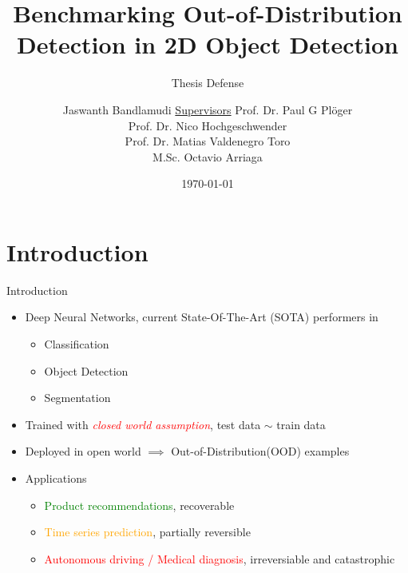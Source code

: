 \documentclass[10pt, aspectratio=169]{beamer}
\author[Jaswanth]{Jaswanth Bandlamudi \newline \newline \underline{Supervisors} \newline \vfill Prof. Dr. Paul G Pl\"{o}ger\\Prof. Dr. Nico Hochgeschwender \\ Prof. Dr. Matias Valdenegro Toro \\ M.Sc. Octavio Arriaga}
\title{Benchmarking Out-of-Distribution Detection in 2D Object Detection}
\subtitle{Thesis Defense}
\institute[HBRS]{Hochschule Bonn-Rhein-Sieg}
\date{\today}
\begin{document}
\setlength{\parskip}{1em}
\renewcommand{\baselinestretch}{1.25}
{
\begin{frame}
\titlepage
\end{frame}
}

\section{Introduction}
\begin{frame}{Introduction}
\begin{itemize}
    \item Deep Neural Networks, current State-Of-The-Art (SOTA) performers in 
    \begin{itemize}
        \item Classification
        \item Object Detection
        \item Segmentation
    \end{itemize} 

    \item Trained with \textcolor{red}{\textit{closed world assumption}}, test data $\sim$ train data
    \item Deployed in open world $\implies$ Out-of-Distribution(OOD) examples
    \item Applications
        \begin{itemize}
            \item \textcolor{green}{Product recommendations}, recoverable
            \item \textcolor{orange}{Time series prediction}, partially reversible
            \item \textcolor{red}{Autonomous driving / Medical diagnosis}, irreversiable and catastrophic
        \end{itemize}
\end{itemize}
\end{frame}
\end{document}
